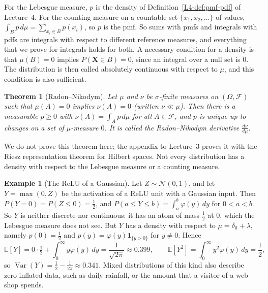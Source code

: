\documentclass[11pt]{article}
\newcommand{\E}{\mathbb{E}}
\DeclareMathOperator{\Var}{Var}
\theoremstyle{definition}
\newtheorem{example}[definition]{Example}
\theoremstyle{plain}
\newtheorem{theorem}[definition]{Theorem}
\theoremstyle{remark}
\begin{document}
For the Lebesgue measure, $p$ is the density of Definition~\ref{L4-def:pmf-pdf} of Lecture~4. For the counting measure on a countable set $\{x_1, x_2, \ldots\}$ of values, $\int_B p\, d\mu = \sum_{x_i \in B} p(x_i)$, so $p$ is the pmf. So sums with pmfs and integrals with pdfs are integrals with respect to different reference measures, and everything that we prove for integrals holds for both. A necessary condition for a density is that $\mu(B) = 0$ implies $P(\mathbf{X} \in B) = 0$, since an integral over a null set is $0$. The distribution is then called absolutely continuous with respect to $\mu$, and this condition is also sufficient.

\begin{theorem}[Radon--Nikodym]\label{thm:radon-nikodym}
    Let $\mu$ and $\nu$ be $\sigma$-finite measures on $(\Omega, \mathcal{F})$ such that $\mu(A) = 0$ implies $\nu(A) = 0$ (written $\nu \ll \mu$). Then there is a measurable $p \geq 0$ with $\nu(A) = \int_A p\, d\mu$ for all $A \in \mathcal{F}$, and $p$ is unique up to changes on a set of $\mu$-measure $0$. It is called the Radon--Nikodym derivative $\frac{d\nu}{d\mu}$.
\end{theorem}

We do not prove this theorem here; the appendix to Lecture~3 proves it with the Riesz representation theorem for Hilbert spaces. Not every distribution has a density with respect to the Lebesgue measure or a counting measure.

\begin{example}[The ReLU of a Gaussian]\label{ex:relu-gaussian}
    Let $Z \sim \mathcal{N}(0, 1)$, and let $Y = \max(0, Z)$ be the activation of a ReLU unit with a Gaussian input. Then $P(Y = 0) = P(Z \leq 0) = \frac{1}{2}$, and $P(a \leq Y \leq b) = \int_a^b \varphi(y)\, dy$ for $0 < a < b$. So $Y$ is neither discrete nor continuous: it has an atom of mass $\frac{1}{2}$ at $0$, which the Lebesgue measure does not see. But $Y$ has a density with respect to $\mu = \delta_0 + \lambda$, namely $p(0) = \frac{1}{2}$ and $p(y) = \varphi(y)\mathbf{1}_{\{y > 0\}}$ for $y \neq 0$. Hence
    \[\E[Y] = 0 \cdot \tfrac{1}{2} + \int_0^\infty y\varphi(y)\, dy = \frac{1}{\sqrt{2\pi}} \approx 0.399, \qquad \E[Y^2] = \int_0^\infty y^2\varphi(y)\, dy = \frac{1}{2},\]
    so $\Var(Y) = \frac{1}{2} - \frac{1}{2\pi} \approx 0.341$. Mixed distributions of this kind also describe zero-inflated data, such as daily rainfall, or the amount that a visitor of a web shop spends.
\end{example}
\end{document}
